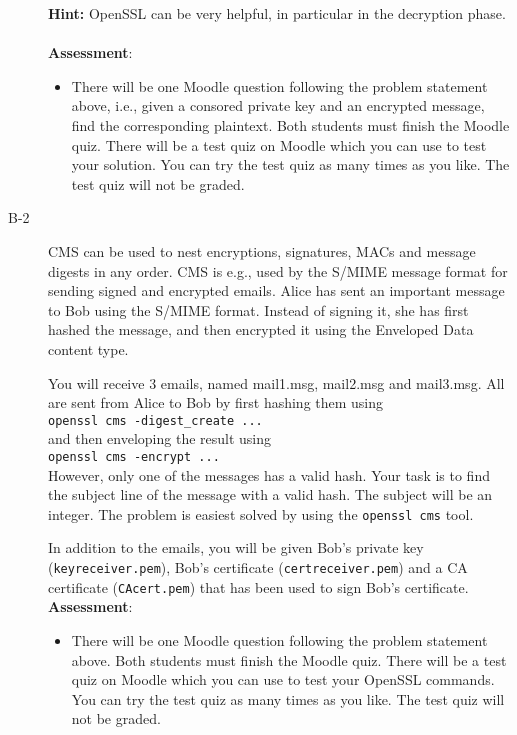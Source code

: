 \documentclass{article}
\begin{document}
\begin{description}
{			\textbf{Hint:} OpenSSL can be very helpful, in particular in the decryption phase.\\\\
			
			\textbf{Assessment}:
			\begin{itemize}
				\item There will be one Moodle question following the problem statement above, i.e., given a consored private key and an encrypted message, find the corresponding plaintext. Both students must finish the Moodle quiz.
				There will be a test quiz on Moodle which you can use to test your solution. You can try the test quiz as many times as you like. The test quiz will not be graded.
			\end{itemize}
		}
		
		\item[B-2]{CMS can be used to nest encryptions, signatures, MACs and message digests in any order. CMS is e.g., used by the S/MIME message format for sending signed and encrypted emails. Alice has sent an important message to Bob using the S/MIME format. Instead of signing it, she has first hashed the message, and then encrypted it using the Enveloped Data content type.
			
			You will receive 3 emails, named mail1.msg, mail2.msg and mail3.msg. All are sent from Alice to Bob by first hashing them using \\ \texttt{openssl cms -digest\_create ...}\\ and then enveloping the result using \\\texttt{openssl cms -encrypt ...}\\However, only one of the messages has a valid hash. Your task is to find the subject line of the message with a valid hash. The subject will be an integer. The problem is easiest solved by using the \texttt{openssl cms} tool.
			
			In addition to the emails, you will be given Bob's private key (\texttt{keyreceiver.pem}), Bob's certificate (\texttt{certreceiver.pem}) and a CA certificate (\texttt{CAcert.pem}) that has been used to sign Bob's certificate.\\
			\textbf{Assessment}:
			\begin{itemize}
				\item There will be one Moodle question following the problem statement above. Both students must finish the Moodle quiz.
				There will be a test quiz on Moodle which you can use to test your OpenSSL commands. You can try the test quiz as many times as you like. The test quiz will not be graded.
			\end{itemize}}
			

\end{description}
\end{document}
